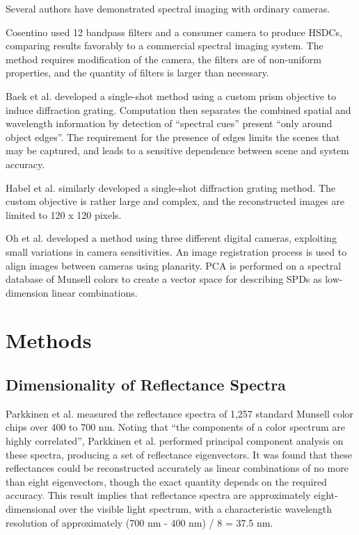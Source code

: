\documentclass[twocolumn,10pt]{asme2ej}
\newcommand{\id}{\hspace{6 mm}}
\begin{document}
Several authors have demonstrated spectral imaging with ordinary cameras.

\id Cosentino \cite{Cosentino} used 12 bandpass filters and a consumer camera to produce HSDCs, comparing results favorably to a commercial spectral imaging system. The method requires modification of the camera, the filters are of non-uniform properties, and the quantity of filters is larger than necessary.

\id Baek et al. \cite{Baek} developed a single-shot method using a custom prism objective to induce diffraction grating. Computation then separates the combined spatial and wavelength information by detection of ``spectral cues'' present ``only around object edges''. The requirement for the presence of edges limits the scenes that may be captured, and leads to a sensitive dependence between scene and system accuracy.

\id Habel et al. \cite{Habel} similarly developed a single-shot diffraction grating method. The custom objective is rather large and complex, and the reconstructed images are limited to 120 x 120 pixels.

\id Oh et al. \cite{Oh} developed a method using three different digital cameras, exploiting small variations in camera sensitivities. An image registration process is used to align images between cameras using planarity. PCA is performed on a spectral database of Munsell colors to create a vector space for describing SPDs as low-dimension linear combinations.

\section{Methods}

\subsection{Dimensionality of Reflectance Spectra}

Parkkinen et al. \cite{Parkkinen} measured the reflectance spectra of 1,257 standard Munsell color chips over 400 to 700 nm. Noting that ``the components of a color spectrum are highly correlated'', Parkkinen et al. performed principal component analysis on these spectra, producing a set of reflectance eigenvectors. It was found that these reflectances could be reconstructed accurately as linear combinations of no more than eight eigenvectors, though the exact quantity depends on the required accuracy. This result implies that reflectance spectra are approximately eight-dimensional over the visible light spectrum, with a characteristic wavelength resolution of approximately (700 nm - 400 nm) / 8 = 37.5 nm.
\end{document}
